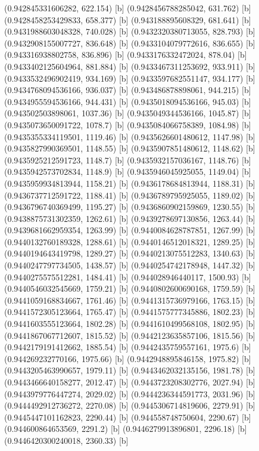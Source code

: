 {{{(0.942845331606282, 622.154) [b] 
(0.9428456788285042, 631.762) [b] 
(0.9428458253429833, 658.377) [b] 
(0.943188895608329, 681.641) [b] 
(0.9431988603048328, 740.028) [b] 
(0.9432320380713055, 828.793) [b] 
(0.9432908155007727, 836.648) [b] 
(0.9433104079772616, 836.655) [b] 
(0.943316938802758, 836.896) [b] 
(0.9433176332472024, 878.04) [b] 
(0.9433402125604964, 881.884) [b] 
(0.9433467311253692, 933.911) [b] 
(0.9433532496902419, 934.169) [b] 
(0.9433597682551147, 934.177) [b] 
(0.9434768094536166, 936.037) [b] 
(0.943486878898061, 944.215) [b] 
(0.9434955594536166, 944.431) [b] 
(0.9435018094536166, 945.03) [b] 
(0.943502503898061, 1037.36) [b] 
(0.9435049344536166, 1045.87) [b] 
(0.9435073650091722, 1078.7) [b] 
(0.9435084066758389, 1084.98) [b] 
(0.9435355334119501, 1119.46) [b] 
(0.9435626601480612, 1147.98) [b] 
(0.9435827990369501, 1148.55) [b] 
(0.9435907851480612, 1148.62) [b] 
(0.9435925212591723, 1148.7) [b] 
(0.9435932157036167, 1148.76) [b] 
(0.9435942573702834, 1148.9) [b] 
(0.9435946045925055, 1149.04) [b] 
(0.9435959934813944, 1158.21) [b] 
(0.9436178684813944, 1188.31) [b] 
(0.9436737712591722, 1188.41) [b] 
(0.9436789795925055, 1189.02) [b] 
(0.9436796740369499, 1195.27) [b] 
(0.9436860902159869, 1230.55) [b] 
(0.9438875731302359, 1262.61) [b] 
(0.9439278697130856, 1263.44) [b] 
(0.9439681662959354, 1263.99) [b] 
(0.9440084628787851, 1267.99) [b] 
(0.9440132760189328, 1288.61) [b] 
(0.9440146512018321, 1289.25) [b] 
(0.9440194643419798, 1289.27) [b] 
(0.9440213075512283, 1340.63) [b] 
(0.9440247797734505, 1438.57) [b] 
(0.9440254742178948, 1447.32) [b] 
(0.9440275575512281, 1484.41) [b] 
(0.944028946440117, 1500.93) [b] 
(0.9440546032545669, 1759.21) [b] 
(0.9440802600690168, 1759.59) [b] 
(0.9441059168834667, 1761.46) [b] 
(0.9441315736979166, 1763.15) [b] 
(0.9441572305123664, 1765.47) [b] 
(0.9441575777345886, 1802.23) [b] 
(0.9441603555123664, 1802.28) [b] 
(0.9441610499568108, 1802.95) [b] 
(0.9441867067712607, 1815.52) [b] 
(0.9442123635857106, 1815.56) [b] 
(0.9442179191412662, 1885.54) [b] 
(0.9442435759557161, 1975.6) [b] 
(0.944269232770166, 1975.66) [b] 
(0.9442948895846158, 1975.82) [b] 
(0.9443205463990657, 1979.11) [b] 
(0.9443462032135156, 1981.78) [b] 
(0.9443466640158277, 2012.47) [b] 
(0.9443723208302776, 2027.94) [b] 
(0.9443979776447274, 2029.02) [b] 
(0.9444236344591773, 2031.96) [b] 
(0.9444492912736272, 2270.08) [b] 
(0.9445306714819606, 2279.91) [b] 
(0.9445447101162823, 2290.44) [b] 
(0.944558748750604, 2290.67) [b] 
(0.944600864653569, 2291.2) [b] 
(0.9446279913896801, 2296.18) [b] 
(0.9446420300240018, 2360.33) [b] 
}}}
